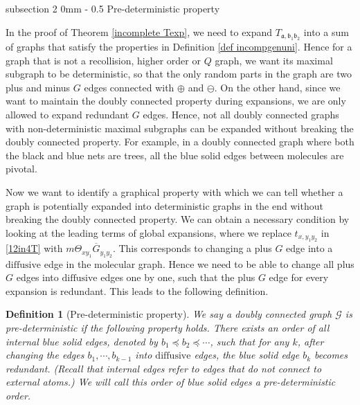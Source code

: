 \documentclass{article}
\makeatletter
\newcommand{\1}{\mathds{1}}
\numberwithin{equation}{section}
\newcommand{\fa}{{\mathfrak a}}
\newcommand{\fb}{{\mathfrak b}}
\renewcommand{\cal}{\mathcal}
\newcommand{\dashed}{\text{diffusive}}
\theoremstyle{plain} %
\newtheorem{definition}[theorem]{Definition}
\theoremstyle{remark}
\newcommand{\cob}{\color{purple}}
\newcommand{\nc}{\normalcolor}
\renewcommand{\subsection}{\@startsection
	{subsection}%
	{2}%
	{0mm}%
	{-\baselineskip}%
	{0.5\baselineskip}%
	{\normalfont\bf\itshape}} %
\makeatother
\begin{document}
\subsection{Pre-deterministic property} 

In the proof of Theorem \ref{incomplete Texp}, we need to expand $T_{\fa, \fb_1\fb_2}$ into a sum of graphs that satisfy the properties in Definition \ref{def incompgenuni}. Hence for a graph that is not a recollision, higher order or $Q$ graph, we want its maximal subgraph to be deterministic, so that the only random parts in the graph are two plus and minus $G$ edges connected with $\oplus$ and $\ominus$. 
On the other hand, since we want to maintain the doubly connected property during expansions, we are only allowed to expand redundant $G$ edges. Hence, not all doubly connected graphs with non-deterministic maximal subgraphs can be expanded without breaking the doubly connected property. For example, in a doubly connected graph where both the black and blue nets are trees, all the blue solid edges  between molecules are pivotal.  

Now we want to identify a graphical property with which we can tell whether a graph is potentially expanded into deterministic graphs in the end without breaking the doubly connected property. We can obtain a necessary condition by looking at the leading terms of global expansions, where we replace $t_{x,y_1y_2}$ in \eqref{12in4T} with $m \Theta_{xy_1}\overline G_{y_1y_2}$. This corresponds to changing a plus $G$ edge into a $\dashed$ edge in the molecular graph. Hence we need to be able to change all plus $G$ edges into $\dashed$ edges one by one, such that the plus $G$ edge for every expansion is redundant. This leads to the following definition. %

\begin{definition} [Pre-deterministic property] \label{def PDG} %
We say a doubly connected graph $\cal G$ is \emph{pre-deterministic} if the following property holds. There exists an order of all  internal blue solid edges, denoted by $b_1 \preceq b_2 \preceq \cdots$, such that for any $k$, after changing the edges $b_1, \cdots, b_{k-1} $ into $\dashed$ edges, the blue solid edge $b_k$ becomes redundant. (Recall that internal edges refer to edges that do not connect to external atoms.) We will call this order of blue solid edges a \emph{pre-deterministic order}.
\end{definition}
\end{document}
